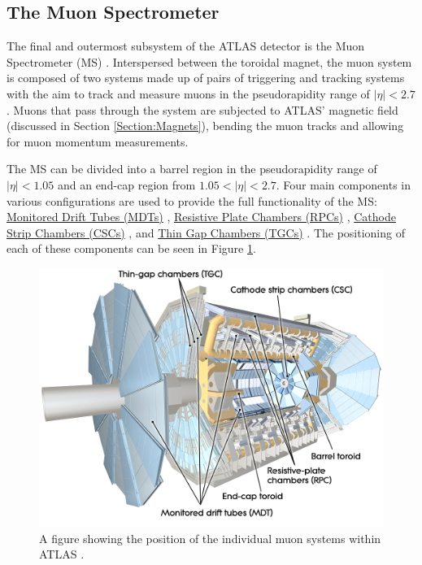 \documentclass[12pt,a4paper,epsf,portrait,times,epsfig]{report}
\begin{document}
		\subsection{The Muon Spectrometer}\label{Section:MuonSystem}

		The final and outermost subsystem of the ATLAS detector is the Muon Spectrometer (MS) \cite{ATLASMuonTDR}. Interspersed between the toroidal magnet, the muon system is composed of two systems made up of pairs of triggering and tracking systems with the aim to track and measure muons in the pseudorapidity range of $|\eta| < 2.7$. Muons that pass through the system are subjected to ATLAS' magnetic field (discussed in Section \ref{Section:Magnets}), bending the muon tracks and allowing for muon momentum measurements. \par

		The MS can be divided into a barrel region in the pseudorapidity range of $|\eta| < 1.05$ and an end-cap region from $1.05 < |\eta| < 2.7$. Four main components in various configurations are used to provide the full functionality of the MS: \hyperref[Section:MDTs]{Monitored Drift Tubes (MDTs)} \cite{ATLASMDT}, \hyperref[Section:RPCs]{Resistive Plate Chambers (RPCs)} \cite{ATLASRPC}, \hyperref[Section:CSCs]{Cathode Strip Chambers (CSCs)} \cite{ATLASCSC}, and \hyperref[Section:TGCs]{Thin Gap Chambers (TGCs)} \cite{ATLASTGC}. The positioning of each of these components can be seen in Figure \ref{Fig:MuonSystem}. 

		\begin{figure}
			\centering
			\includegraphics[scale=0.3]{Muon_System}
			\caption{A figure showing the position of the individual muon systems within ATLAS \cite{Article:ATLASDesignPaper}.}
			\label{Fig:MuonSystem}
		\end{figure}
\end{document}
